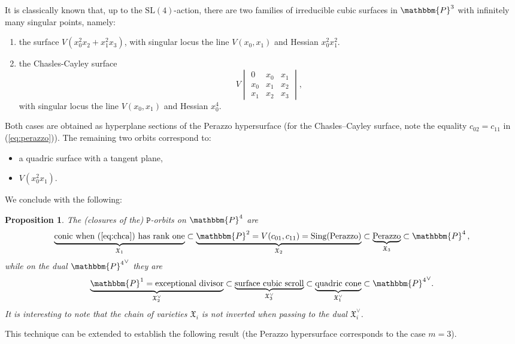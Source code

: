 \documentclass[aps,floatfix,groupedaddress,superscriptaddress,longbibliography,footinbib,notitlepage,showpacs]{revtex4-1}
\newtheorem{proposition}[theorem]{Proposition}
\begin{document}
It is classically known that, up to the $\mathrm{SL}(4)$-action, there are two families of irreducible cubic surfaces in $\mathbbm{P}^3$ with infinitely many singular points, namely:
\begin{enumerate}
\item {the surface $V(x_0^2x_2+x_1^2x_3)$, with singular locus the line $V(x_0, x_1)$
and Hessian $x_0^2x_1^2$.}
\item  {the Chasles-Cayley surface
\begin{equation}\label{eq:chca}V\begin{vmatrix}0&x_0&x_1\\x_0&x_1&x_2\\x_1&x_2&x_3\end{vmatrix},\end{equation}
with singular locus the line $V(x_0, x_1)$ and Hessian $x_0^4$.}
\end{enumerate}

Both cases are obtained as hyperplane sections of the Perazzo hypersurface (for the Chasles–Cayley surface, note the equality $c_{02} = c_{11}$ in (\ref{eq:perazzo})).  
The remaining two orbits correspond to:
\begin{itemize}
\item a quadric surface with a tangent plane,
\item $V(x_0^2 x_1)$.
\end{itemize}

We conclude with the following:

\begin{proposition}
The (closures of the) $\mathtt{P}$-orbits on $\mathbbm{P}^4$ are
\[
\underbrace{\text{conic when (\ref{eq:chca}) has rank one}}_{\mathfrak{X}_1} \subset 
\underbrace{\mathbbm{P}^2 = V(c_{01},c_{11}) = \text{Sing}(\text{Perazzo})}_{\mathfrak{X}_2} \subset 
\underbrace{\text{Perazzo}}_{\mathfrak{X}_3} \subset \mathbbm{P}^4\,,
\]
while on the dual ${\mathbbm{P}^4}^\vee$ they are
\[
\underbrace{\mathbbm{P}^1 = \text{exceptional divisor}}_{\mathfrak{X}_2^\vee} \subset 
\underbrace{\text{surface cubic scroll}}_{\mathfrak{X}_3^\vee} \subset 
\underbrace{\text{quadric cone}}_{\mathfrak{X}_1^\vee} \subset {\mathbbm{P}^4}^\vee.
\]
It is interesting to note that the chain of varieties $\mathfrak{X}_i$ is \emph{not} inverted when passing to the dual $\mathfrak{X}_i^\vee$.
\end{proposition}

This technique can be extended to establish the following result (the Perazzo hypersurface corresponds to the case $m=3$).
\end{document}
